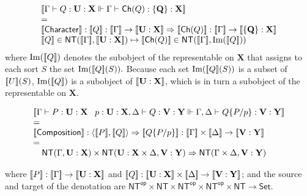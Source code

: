 $$\begin{array}{l}
  \meaningof{\Gamma \vdash Q : \mathbf{U} : \mathbf {X} \Vdash \Gamma \vdash \mathsf{Ch}(Q) : \mathbf{\{ Q \}} : \mathbf {X}} \\
  = \\
  \meaningof{\mathsf{Character}} : \meaningof{Q} : \meaningof{\Gamma} \to \meaningof{\mathbf{U} : \mathbf{X}} \Rightarrow \meaningof{\mathsf{Ch}(Q)} : \meaningof{\Gamma} \to \meaningof{\mathbf{\{ Q \}} : \mathbf {X}} \\
	\meaningof{Q}\in \mathsf{NT}(\meaningof{\Gamma}, \meaningof{\mathbf{U} : \mathbf{X}}) \mapsto \meaningof{\mathsf{Ch}(Q)} \in \mathsf{NT}(\meaningof{\Gamma}, {\rm Im}(\meaningof{Q}))
\end{array}$$
where ${\rm Im}([\![ Q ]\!])$ denotes the subobject of the representable on $\mathbf{X}$ that assigns to each sort $S$ the set ${\rm Im}([\![ Q ]\!](S)).$  Because each set ${\rm Im}([\![ Q ]\!](S))$ is a subset of $[\![ U ]\!](S)$, ${\rm Im}([\![ Q ]\!])$ is a subobject of $[\![ \mathbf{U} : \mathbf{X} ]\!]$, which is in turn a subobject of the representable on $\mathbf{X}$.

$$\begin{array}{l}
  \meaningof{\Gamma \vdash P : \mathbf{U} : \mathbf {X} \;\;\; p : \mathbf{U} : \mathbf {X}, \Delta \vdash Q : \mathbf{V} : \mathbf {Y} \Vdash \Gamma, \Delta \vdash Q \substn{P}{p} : \mathbf{V} : \mathbf {Y}} \\
  = \\
  \meaningof{\mathsf{Composition}} : \langle \meaningof{P}, \meaningof{Q} \rangle \Rightarrow \meaningof{Q\substn{P}{p}} : \meaningof{\Gamma} \times \meaningof{\Delta} \to \meaningof{\mathbf{V} : \mathbf{Y}} \\
  = \\
  \quad \mathsf{NT}(\Gamma,\mathbf{U} : \mathbf {X}) \times \mathsf{NT}(\mathbf{U} : \mathbf {X} \times \Delta, \mathbf{V} : \mathbf {Y}) \Rightarrow \mathsf{NT}(\Gamma \times \Delta, \mathbf{V} : \mathbf {Y})
\end{array}$$

where $[\![ P ]\!] : [\![ \Gamma ]\!] \to [\![ \mathbf{U} : \mathbf{X} ]\!]$ and $ \meaningof{Q} : \meaningof{\mathbf{U} : \mathbf{X}} \times \meaningof{\Delta} \to \meaningof{\mathbf{V} : \mathbf{Y}}$; and the source and target of the denotation are $\mathsf{NT}^{\mathsf{op}} \times \mathsf{NT} \times \mathsf{NT}^{\mathsf{op}} \times \mathsf{NT}^{\mathsf{op}} \times \mathsf{NT} \to \mathsf{Set}$.



